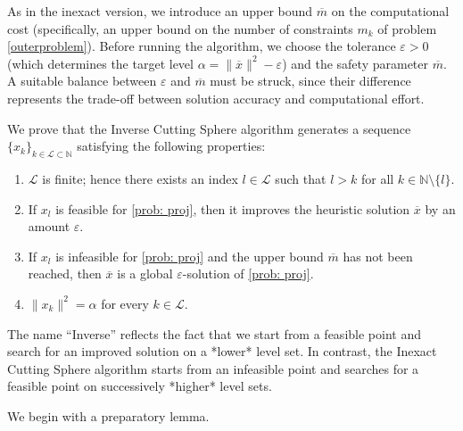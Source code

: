\documentclass[12pt]{amsart}
\theoremstyle{plain}
\theoremstyle{definition}
\begin{document}
As in the inexact version, we introduce an upper bound \(\overline{m}\) on the computational cost (specifically, an upper bound on the number of constraints \(m_k\) of problem \eqref{outerproblem}). Before running the algorithm, we choose the tolerance \(\varepsilon > 0\) (which determines the target level \(\alpha = \|\overline{x}\|^2 - \varepsilon\)) and the safety parameter \(\overline{m}\). A suitable balance between \(\varepsilon\) and \(\overline{m}\) must be struck, since their difference represents the trade-off between solution accuracy and computational effort.

We prove that the Inverse Cutting Sphere algorithm generates a sequence \(\{x_k\}_{k \in \mathcal{L} \subset \mathbb{N}}\) satisfying the following properties:
\begin{enumerate}
    \item \(\mathcal{L}\) is finite; hence there exists an index \(l \in \mathcal{L}\) such that \(l > k\) for all \(k \in \mathbb{N} \setminus \{l\}\).
    \item If \(x_l\) is feasible for \eqref{prob: proj}, then it improves the heuristic solution \(\overline{x}\) by an amount \(\varepsilon\).
    \item If \(x_l\) is infeasible for \eqref{prob: proj} and the upper bound \(\overline{m}\) has not been reached, then \(\overline{x}\) is a global \(\varepsilon\)-solution of \eqref{prob: proj}.
    \item \(\|x_k\|^2 = \alpha\) for every \(k \in \mathcal{L}\).
\end{enumerate}

The name “Inverse” reflects the fact that we start from a feasible point and search for an improved solution on a *lower* level set. In contrast, the Inexact Cutting Sphere algorithm \cite[Algorithm 3]{bednarczuk2026outer} starts from an infeasible point and searches for a feasible point on successively *higher* level sets.

We begin with a preparatory lemma.
\end{document}
